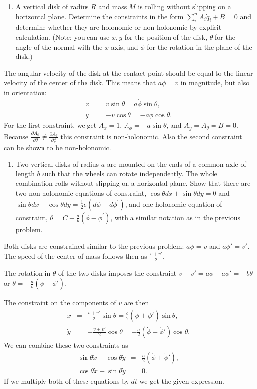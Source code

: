 \documentclass[letterpaper,11pt]{article}
\begin{document}
\begin{enumerate}[resume]
 \item A vertical disk of radius $R$ and mass $M$ is rolling without slipping on a horizontal plane.  Determine the constraints in the form $\sum_i^n A_i \dot{q}_i + B = 0$ and determine whether they are holonomic or non-holonomic by explicit calculation.  (Note: you can use $x,y$ for the position of the disk, $\theta$ for the angle of the normal with the $x$ axis, and $\phi$ for the rotation in the plane of the disk.)
\end{enumerate}
The angular velocity of the disk at the contact point should be equal to the linear velocity of the center of the disk.  This means that $a\dot\phi = v$ in magnitude, but also in orientation:
\begin{eqnarray*}
 \dot{x} & = & v \sin\theta = a \dot\phi \sin\theta, \\
 \dot{y} & = & - v \cos\theta = - a \dot\phi \cos\theta.
\end{eqnarray*}
For the first constraint, we get $A_x = 1$, $A_\phi = -a \sin\theta$, and $A_y = A_\theta = B = 0$.  Because $\frac{\partial A_\phi}{\partial \theta} \neq \frac{\partial A_\theta}{\partial \phi}$ this constraint is non-holonomic.  Also the second constraint can be shown to be non-holonomic.

\begin{enumerate}[resume]
 \item Two vertical disks of radius $a$ are mounted on the ends of a common axle of length $b$ such that the wheels can rotate independently.  The whole combination rolls without slipping on a horizontal plane.  Show that there are two non-holonomic equations of constraint, $\cos\theta dx + \sin\theta dy = 0$ and $\sin\theta dx - \cos\theta dy = \frac{1}{2} a (d\phi+d\phi^\prime)$, and one holonomic equation of constraint, $\theta = C - \frac{a}{b}(\phi-\phi^\prime)$, with a similar notation as in the previous problem.
\end{enumerate}
Both disks are constrained similar to the previous problem: $a\dot\phi = v$ and $a\dot\phi' = v'$.  The speed of the center of mass follows then as $\frac{v + v'}{2}$.

The rotation in $\theta$ of the two disks imposes the constraint $v - v' = a\dot\phi - a\dot\phi' = -b\dot\theta$ or $\dot\theta = -\frac{a}{b} (\dot\phi - \dot\phi')$.

The constraint on the components of $v$ are then
\begin{eqnarray*}
 \dot{x} & = & \frac{v + v'}{2} \sin\theta = \frac{a}{2} (\dot\phi + \dot\phi') \sin\theta, \\
 \dot{y} & = & - \frac{v + v'}{2} \cos\theta = - \frac{a}{2} (\dot\phi + \dot\phi') \cos\theta.
\end{eqnarray*}
We can combine these two constraints as
\begin{eqnarray*}
 \sin\theta \dot{x} - \cos\theta \dot{y} & = & \frac{a}{2} (\dot\phi + \dot\phi'), \\
 \cos\theta \dot{x} + \sin\theta \dot{y} & = & 0.
\end{eqnarray*}
If we multiply both of these equations by $dt$ we get the given expression.
\end{document}

